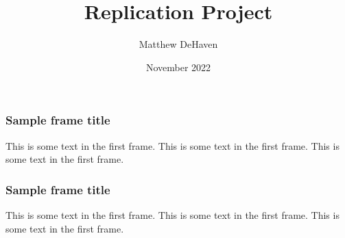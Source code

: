 \documentclass{beamer}
\title{Replication Project}
\author{Matthew DeHaven}
\institute{Brown University}
\date{November 2022}
\begin{document}
\frame{\titlepage}

\begin{frame}
\frametitle{Sample frame title}
This is some text in the first frame. This is some text in the first frame. This is some text in the first frame.
\end{frame}

\begin{frame}
\frametitle{Sample frame title}
This is some text in the first frame. This is some text in the first frame. This is some text in the first frame.
\end{frame}
\end{document}
